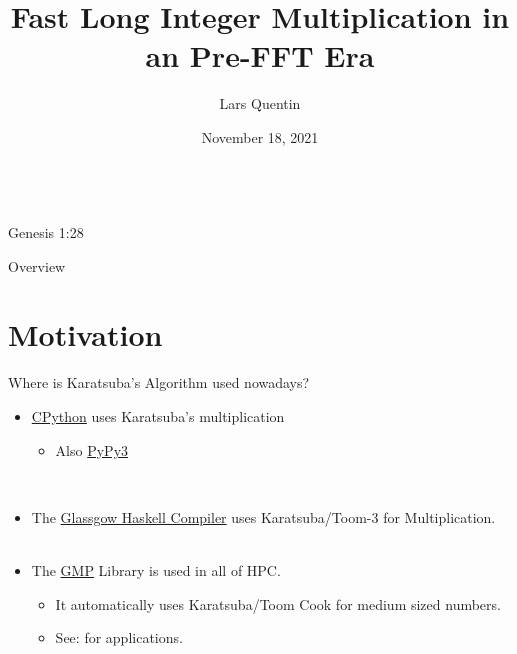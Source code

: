 \documentclass[12pt]{beamer}
\title{Fast Long Integer Multiplication in an Pre-FFT Era}
\author{Lars Quentin}
\institute{University of G\"ottingen}
\date{November 18, 2021}
\begin{document}
\frame{\titlepage}

\begin{frame}{}
\begin{center}
{\Huge {}}\\
Genesis 1:28
\end{center}
\end{frame}

\begin{frame}{Overview}
\tableofcontents
\end{frame}

\section{Motivation}



\begin{frame}{}
\begin{block}{Where is Karatsuba's Algorithm used nowadays?}
\begin{itemize}
\item \href{https://docs.python.org/3/library/decimal.html}{CPython} uses Karatsuba's multiplication
\begin{itemize}
\item Also \href{https://docs.python.org/3/library/decimal.html}{PyPy3}
\end{itemize}
~\\
\item The \href{https://github.com/ghc/ghc/blob/master/libraries/integer-gmp/src/GHC/Integer/GMP/Internals.hs}{Glassgow Haskell Compiler} uses Karatsuba/Toom-3 for Multiplication.\\~\\
\item The \href{https://en.wikipedia.org/wiki/GNU\_Multiple\_Precision\_Arithmetic\_Library}{GMP} Library is used in all of HPC.
\begin{itemize}
\item It automatically uses Karatsuba/Toom Cook for medium sized numbers.
\item See: \href{https://doi.org/10.3390/math3020337}{} for applications.
\end{itemize}
\end{itemize}
\end{block}
\end{frame}
\end{document}
